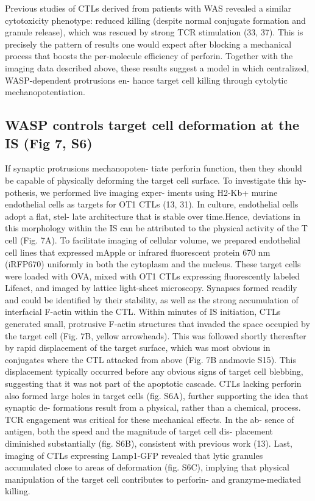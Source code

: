 Previous studies of CTLs derived from patients with WAS revealed a similar cytotoxicity phenotype: reduced killing (despite normal conjugate formation and granule release), which was rescued by strong TCR stimulation (33, 37). This is precisely the pattern of results one would expect after blocking a mechanical process that boosts the per-molecule efficiency of perforin. Together with the imaging data described above, these results suggest a model in which centralized, WASP-dependent protrusions en- hance target cell killing through cytolytic mechanopotentiation.

\subsection{WASP controls target cell deformation at the IS (Fig 7, S6)}
If synaptic protrusions mechanopoten- tiate perforin function, then they should be capable of physically deforming the target cell surface. To investigate this hy- pothesis, we performed live imaging exper- iments using H2-Kb+ murine endothelial cells as targets for OT1 CTLs (13, 31). In culture, endothelial cells adopt a flat, stel- late architecture that is stable over time.Hence, deviations in this morphology within the IS can be attributed to the physical activity of the T cell (Fig. 7A). To facilitate imaging of cellular volume, we prepared endothelial cell lines that expressed mApple or infrared fluorescent protein 670 nm (iRFP670) uniformly in both the cytoplasm and the nucleus. These target cells were loaded with OVA, mixed with OT1 CTLs expressing fluorescently labeled Lifeact, and imaged by lattice light-sheet microscopy. Synapses formed readily and could be identified by their stability, as well as the strong accumulation of interfacial F-actin within the CTL. Within minutes of IS initiation, CTLs generated small, protrusive F-actin structures that invaded the space occupied by the target cell (Fig. 7B, yellow arrowheads). This was followed shortly thereafter by rapid displacement of the target surface, which was most obvious in conjugates where the CTL attacked from above (Fig. 7B andmovie S15). This displacement typically occurred before any obvious signs of target cell blebbing, suggesting that it was not part of the apoptotic cascade. CTLs lacking perforin also formed large holes in target cells (fig. S6A), further supporting the idea that synaptic de- formations result from a physical, rather than a chemical, process. TCR engagement was critical for these mechanical effects. In the ab- sence of antigen, both the speed and the magnitude of target cell dis- placement diminished substantially (fig. S6B), consistent with previous work (13). Last, imaging of CTLs expressing Lamp1-GFP revealed that lytic granules accumulated close to areas of deformation (fig. S6C), implying that physical manipulation of the target cell contributes to perforin- and granzyme-mediated killing.

